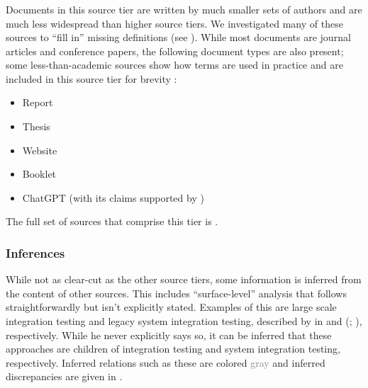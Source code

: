 \subsubsection{}
\label{papers}

Documents in this source tier are written by much smaller sets of authors
and are much less widespread than higher source tiers. We investigated%
 many of
these sources to ``fill in'' missing definitions (see ).
While most documents are journal articles and conference papers, the following
document types are also present; some less-than-academic sources show how terms
are used in practice and are included in this source tier for brevity%
:

\begin{itemize}
    \item Report \citep{Kam2008,Gerrard2000a,Gerrard2000b}
    \item Thesis \citep{Bas2024}
    \item Website \citep{LambdaTest2024,Pandey2023}
    \item Booklet \citep{SPICE2022}
    \item \ifnotpaper \else ChatGPT \fi \citet{ChatGPT2024} (with its claims
          supported by \citet{RusEtAl2008})
\end{itemize}

The full set of sources that comprise this tier is .

\ifnotpaper
    \subsubsection{Inferences}
    \label{infers}
    While not as clear-cut as the other source tiers, some information is
    inferred from the content of other sources. This includes ``surface-level''
    analysis that follows straightforwardly but isn't explicitly stated.
    Examples of this are large scale integration testing and legacy system
    integration testing, described by \citeauthor{Gerrard2000a} in
    \citeyearpar[p.~30]{Gerrard2000b} and (\citeyear[Tab.~2]{Gerrard2000a};
    \citeyear[Tab.~1]{Gerrard2000b}), respectively. While he never explicitly
    says so, it can be inferred that these approaches are children of
    integration testing and system integration testing, respectively. Inferred
    relations such as these are colored \textcolor{gray}{gray} and inferred
    discrepancies are given in .
\fi

